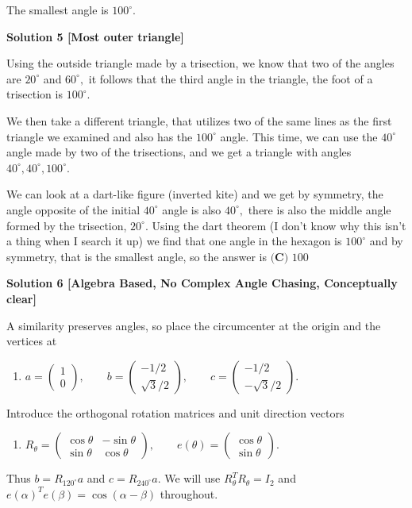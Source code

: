 \begin{enumerate}
 The smallest angle is $100^\circ$.

 



\textbf{Solution 5 [Most outer triangle]}

Using the outside triangle made by a trisection, we know that two of the angles are $20^\circ$ and $60^\circ,$ it follows that the third angle in the triangle, the foot of a trisection is $100^\circ.$

 We then take a different triangle, that utilizes two of the same lines as the first triangle we examined and also has the $100^\circ$ angle. This time, we can use the $40^\circ$ angle made by two of the trisections, and we get a triangle with angles $40^\circ, 40^\circ, 100^\circ.$ 

 We can look at a dart-like figure (inverted kite) and we get by symmetry, the angle opposite of the initial $40^\circ$ angle is also $40^\circ,$ there is also the middle angle formed by the trisection, $20^\circ.$ Using the dart theorem (I don't know why this isn't a thing when I search it up) we find that one angle in the hexagon is $100^\circ$ and by symmetry, that is the smallest angle, so the answer is $\boxed{\textbf{(C) }100}$




\textbf{Solution 6 [Algebra Based, No Complex Angle Chasing, Conceptually clear]}

A similarity preserves angles, so place the circumcenter at the origin and the vertices at

 
            \begin{enumerate}[label=(\roman*)]
                \item $a=\begin{pmatrix}1\\0\end{pmatrix},\qquad b=\begin{pmatrix}-1/2\\ \sqrt3/2\end{pmatrix},\qquad c=\begin{pmatrix}-1/2\\-\sqrt3/2\end{pmatrix}.$
            \end{enumerate}
            Introduce the orthogonal rotation matrices and unit direction vectors

 
            \begin{enumerate}[label=(\roman*)]
                \item $R_\theta= \begin{pmatrix}\cos\theta&-\sin\theta\\ \sin\theta&\cos\theta\end{pmatrix}, \qquad e(\theta)=\begin{pmatrix}\cos\theta\\\sin\theta\end{pmatrix}.$
            \end{enumerate}
            Thus $b=R_{120^\circ}a$ and $c=R_{240^\circ}a$. We will use $R_\theta^TR_\theta=I_2$ and $e(\alpha)^Te(\beta)=\cos(\alpha-\beta)$ throughout.


\end{enumerate}

